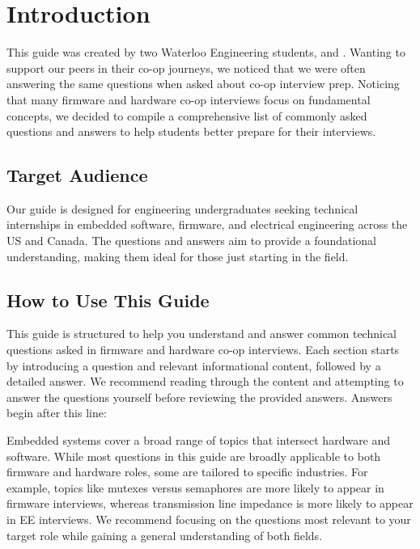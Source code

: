 \documentclass[main.tex]{subfiles}
\begin{document}
\section{Introduction}

This guide was created by two Waterloo Engineering students,  and . Wanting to support our peers in their co-op journeys, we noticed that we were often answering the same questions when asked about co-op interview prep. Noticing that many firmware and hardware co-op interviews focus on fundamental concepts, we decided to compile a comprehensive list of commonly asked questions and answers to help students better prepare for their interviews.

\subsection{Target Audience}
Our guide is designed for engineering undergraduates seeking technical internships in embedded software, firmware, and electrical engineering across the US and Canada. The questions and answers aim to provide a foundational understanding, making them ideal for those just starting in the field.

\subsection{How to Use This Guide}
This guide is structured to help you understand and answer common technical questions asked in firmware and hardware co-op interviews. Each section starts by introducing a question and relevant informational content, followed by a detailed answer. We recommend reading through the content and attempting to answer the questions yourself before reviewing the provided answers. Answers begin after this line:
\spoilerline

\noindent Embedded systems cover a broad range of topics that intersect hardware and software. While most questions in this guide are broadly applicable to both firmware and hardware roles, some are tailored to specific industries. For example, topics like mutexes versus semaphores are more likely to appear in firmware interviews, whereas transmission line impedance is more likely to appear in EE interviews. We recommend focusing on the questions most relevant to your target role while gaining a general understanding of both fields.
\end{document}
